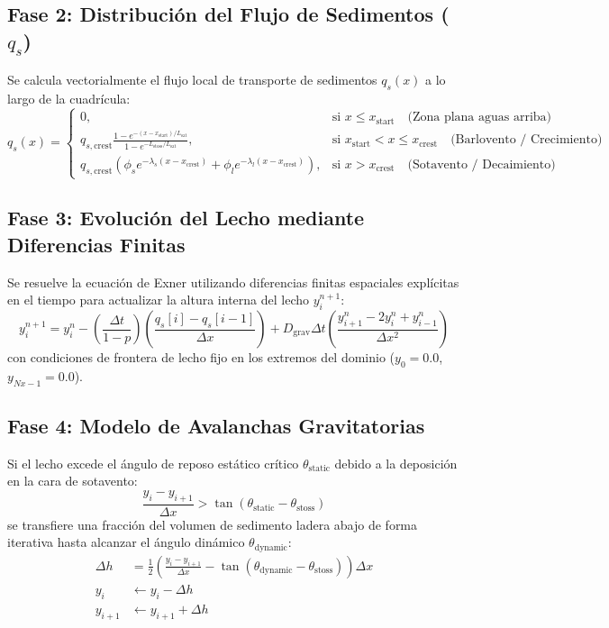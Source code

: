 \documentclass[11pt,a4paper]{article}
\begin{document}
\subsection{Fase 2: Distribución del Flujo de Sedimentos ($q_s$)}
Se calcula vectorialmente el flujo local de transporte de sedimentos $q_s(x)$ a lo largo de la cuadrícula:
\begin{equation}
q_s(x) = \begin{cases} 
0, & \text{si } x \le x_{\text{start}} \quad \text{(Zona plana aguas arriba)} \\
q_{s,\text{crest}} \frac{1 - e^{-(x - x_{\text{start}})/L_{\text{sat}}}}{1 - e^{-L_{\text{stoss}}/L_{\text{sat}}}}, & \text{si } x_{\text{start}} < x \le x_{\text{crest}} \quad \text{(Barlovento / Crecimiento)} \\
q_{s,\text{crest}} \left( \phi_s e^{-\lambda_s(x - x_{\text{crest}})} + \phi_l e^{-\lambda_l(x - x_{\text{crest}})} \right), & \text{si } x > x_{\text{crest}} \quad \text{(Sotavento / Decaimiento)}
\end{cases}
\end{equation}

\subsection{Fase 3: Evolución del Lecho mediante Diferencias Finitas}
Se resuelve la ecuación de Exner utilizando diferencias finitas espaciales explícitas en el tiempo para actualizar la altura interna del lecho $y_i^{n+1}$:
\begin{equation}
    y_i^{n+1} = y_i^n - \left( \frac{\Delta t}{1-p} \right) \left( \frac{q_s[i] - q_s[i-1]}{\Delta x} \right) + D_{\text{grav}} \Delta t \left( \frac{y_{i+1}^n - 2y_i^n + y_{i-1}^n}{\Delta x^2} \right)
\end{equation}
con condiciones de frontera de lecho fijo en los extremos del dominio ($y_0 = 0.0$, $y_{Nx-1} = 0.0$).

\subsection{Fase 4: Modelo de Avalanchas Gravitatorias}
Si el lecho excede el ángulo de reposo estático crítico $\theta_{\text{static}}$ debido a la deposición en la cara de sotavento:
\begin{equation}
    \frac{y_i - y_{i+1}}{\Delta x} > \tan(\theta_{\text{static}} - \theta_{\text{stoss}})
\end{equation}
se transfiere una fracción del volumen de sedimento ladera abajo de forma iterativa hasta alcanzar el ángulo dinámico $\theta_{\text{dynamic}}$:
\begin{align}
    \Delta h &= \frac{1}{2} \left( \frac{y_i - y_{i+1}}{\Delta x} - \tan(\theta_{\text{dynamic}} - \theta_{\text{stoss}}) \right) \Delta x \\
    y_i &\leftarrow y_i - \Delta h \\
    y_{i+1} &\leftarrow y_{i+1} + \Delta h
\end{align}
\end{document}
